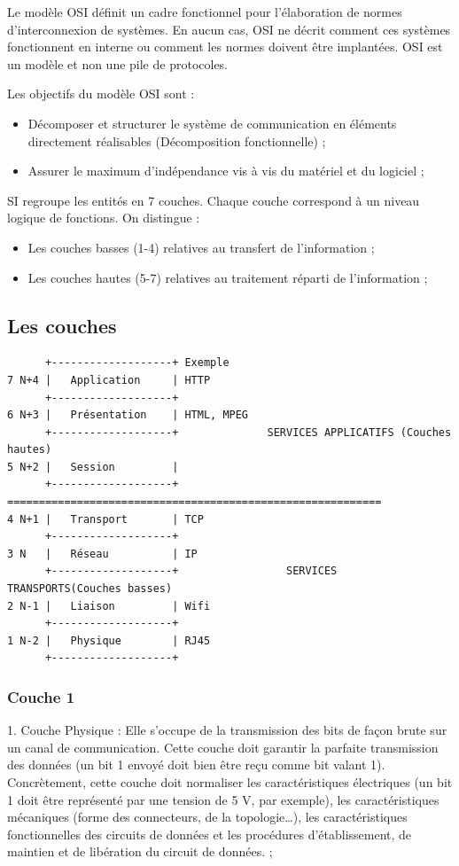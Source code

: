 Le modèle OSI définit un cadre fonctionnel pour l'élaboration de normes d'interconnexion de systèmes. En aucun cas, OSI ne décrit comment ces systèmes fonctionnent en interne ou comment les normes doivent être implantées. OSI est un modèle et non une pile de protocoles.

Les objectifs du modèle OSI sont :
\begin{itemize}
	\item Décomposer et structurer le système de communication en éléments directement réalisables (Décomposition fonctionnelle) ;
	\item Assurer le maximum d'indépendance vis à vis du matériel et du logiciel ;
\end{itemize}

SI regroupe les entités en 7 couches. Chaque couche correspond à un niveau logique de fonctions. On distingue :
\begin{itemize}
	\item Les couches basses (1-4) relatives au transfert de l'information ;
	\item Les couches hautes (5-7) relatives au traitement réparti de l'information ;
\end{itemize}


\subsection{Les couches}
\begin{verbatim}
      +-------------------+ Exemple  
7 N+4 |   Application     | HTTP   
      +-------------------+     
6 N+3 |   Présentation    | HTML, MPEG     
      +-------------------+              SERVICES APPLICATIFS (Couches hautes)
5 N+2 |   Session         |   
      +-------------------+ ===========================================================
4 N+1 |   Transport       | TCP 
      +-------------------+    
3 N   |   Réseau          | IP    
      +-------------------+                 SERVICES TRANSPORTS(Couches basses)
2 N-1 |   Liaison         | Wifi    
      +-------------------+    
1 N-2 |   Physique        | RJ45  
      +-------------------+  
\end{verbatim}
\subsubsection{Couche 1}
1. Couche Physique : Elle s'occupe de la transmission des bits de façon brute sur un canal de communication. Cette couche doit garantir la parfaite transmission des données (un bit 1 envoyé doit bien être reçu comme bit valant 1). Concrètement, cette couche doit normaliser les caractéristiques électriques (un bit 1 doit être représenté par une tension de 5 V, par exemple), les caractéristiques mécaniques (forme des connecteurs, de la topologie\ldots), les caractéristiques fonctionnelles des circuits de données et les procédures d'établissement, de maintien et de libération du circuit de données. ;
